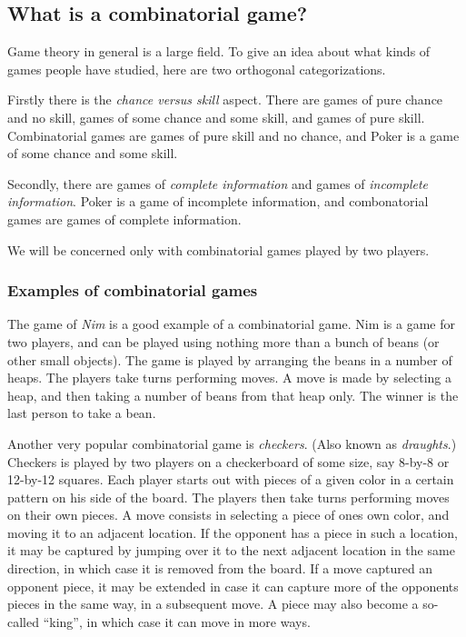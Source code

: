 \subsection{What is a combinatorial game?}

Game theory in general is a large field.
To give an idea about what kinds of games people have studied, here are two orthogonal categorizations.

Firstly there is the \emph {chance versus skill} aspect. There are games of pure chance and no skill, games of some chance and some skill, and games of pure skill.
Combinatorial games are games of pure skill and no chance, and Poker is a game of some chance and some skill.

Secondly, there are games of \emph{complete information} and games of \emph{incomplete information}.
Poker is a game of incomplete information, and combonatorial games are games of complete information.

We will be concerned only with combinatorial games played by two players.

\subsubsection{Examples of combinatorial games}

The game of \emph{Nim} is a good example of a combinatorial game.
Nim is a game for two players, and can be played using nothing more than a bunch of beans (or other small objects).
The game is played by arranging the beans in a number of heaps.
The players take turns performing moves. A move is made by selecting a heap, and then taking a number of beans from that heap only. The winner is the last person to take a bean.

Another very popular combinatorial game is \emph{checkers}. (Also known as \emph{draughts}.)
Checkers is played by two players on a checkerboard of some size, say 8-by-8 or 12-by-12 squares.
Each player starts out with pieces of a given color in a certain pattern on his side of the board.
The players then take turns performing moves on their own pieces.
A move consists in selecting a piece of ones own color, and moving it to an adjacent location.
If the opponent has a piece in such a location, it may be captured by jumping over it to the next adjacent location in the same direction, in which case it is removed from the board. If a move captured an opponent piece, it may be extended in case it can capture more of the opponents pieces in the same way, in a subsequent move. A piece may also become a so-called ``king'', in which case it can move in more ways.

